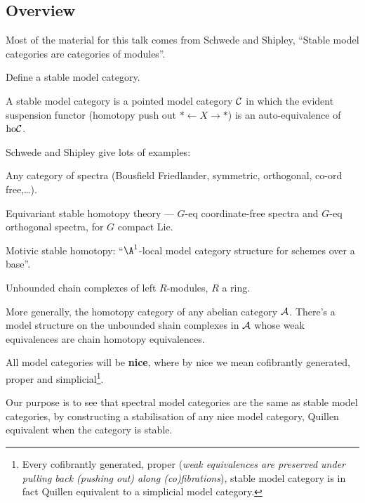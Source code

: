 \documentclass[11pt]{article}
\begin{document}
\begin{MichaelStableModelCats}
\subsection*{Overview}
\begin{itemise}
\item Most of the material for this talk comes from Schwede and Shipley, ``Stable model categories are categories of modules''.
\item Define a stable model category.
\begin{itemise}
\item A stable model category is a pointed model category $\mathcal{C}$ in which the evident suspension functor (homotopy push out $\ast\leftarrow X\rightarrow\ast$) is an auto-equivalence of $\textup{ho}\mathcal{C}$.
\end{itemise}
\item Schwede and Shipley give lots of examples:
\begin{itemise}
\item Any category of spectra (Bousfield Friedlander, symmetric, orthogonal, co-ord free,\ldots).
\item Equivariant stable homotopy theory --- $G$-eq coordinate-free spectra and $G$-eq orthogonal spectra, for $G$ compact Lie.
\item Motivic stable homotopy: ``$\A^1$-local model category structure for schemes over a base''.
\item Unbounded chain complexes of left $R$-modules, $R$ a ring.
\item More generally, the homotopy category of any abelian category $\mathcal{A}$. There's a model structure on the unbounded shain complexes in $\mathcal{A}$ whose weak equivalences are chain homotopy equivalences.
\end{itemise}
\item All model categories will be \textbf{nice}, where by nice we mean cofibrantly generated, proper and simplicial\footnote{Every cofibrantly generated, proper (\textit{weak equivalences are preserved under pulling back (pushing out) along (co)fibrations}), stable model category is in fact Quillen equivalent to a simplicial model category.}. 
\item Our purpose is to see that spectral model categories are the same as stable model categories, by constructing a stabilisation of any nice model category, Quillen equivalent when the category is stable.
\end{itemise}



\end{MichaelStableModelCats}
\end{document}
